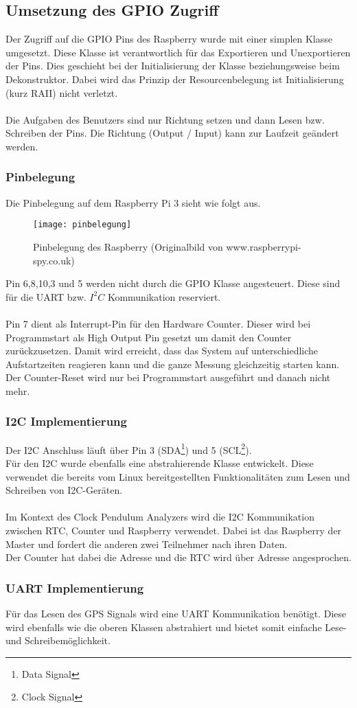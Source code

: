 \subsection{Umsetzung des GPIO Zugriff}
Der Zugriff auf die GPIO Pins des Raspberry wurde mit einer simplen Klasse umgesetzt. Diese Klasse ist verantwortlich für das Exportieren und Unexportieren der Pins. Dies geschieht bei der Initialisierung der Klasse beziehungsweise beim Dekonstruktor. Dabei wird das Prinzip der Resourcenbelegung ist Initialisierung (kurz RAII) nicht verletzt.\\
\\
Die Aufgaben des Benutzers sind nur Richtung setzen und dann Lesen bzw. Schreiben der Pins. Die Richtung (Output / Input) kann zur Laufzeit geändert werden.

\subsubsection{Pinbelegung}
Die Pinbelegung auf dem Raspberry Pi 3 sieht wie folgt aus.
\begin{figure}[H]
    \centering
    \texttt{[image: pinbelegung]}
    \caption{Pinbelegung des Raspberry (Originalbild von www.raspberrypi-spy.co.uk)}
\end{figure}

\noindent Pin 6,8,10,3 und 5 werden nicht durch die GPIO Klasse angesteuert. Diese sind für die UART bzw. $I^2C$ Kommunikation reserviert.\\\\
Pin 7 dient als Interrupt-Pin für den Hardware Counter. Dieser wird bei Programmstart als High Output Pin gesetzt um damit den Counter zurückzusetzen. Damit wird erreicht, dass das System auf unterschiedliche Aufstartzeiten reagieren kann und die ganze Messung gleichzeitig starten kann. Der Counter-Reset wird nur bei Programmstart ausgeführt und danach nicht mehr.

\subsubsection{I2C Implementierung}
Der I2C Anschluss läuft über Pin 3 (SDA\footnote{Data Signal}) und 5 (SCL\footnote{Clock Signal}).\\
Für den I2C wurde ebenfalls eine abstrahierende Klasse entwickelt. Diese verwendet die bereits vom Linux bereitgestellten Funktionalitäten zum Lesen und Schreiben von I2C-Geräten.\\
\\
Im Kontext des Clock Pendulum Analyzers wird die I2C Kommunikation zwischen RTC, Counter und Raspberry verwendet. Dabei ist das Raspberry der Master und fordert die anderen zwei Teilnehmer nach ihren Daten.\\
Der Counter hat dabei die Adresse %
und die RTC wird über Adresse %
angesprochen.

\subsubsection{UART Implementierung}%
Für das Lesen des GPS Signals wird eine UART Kommunikation benötigt. Diese wird ebenfalls wie die oberen Klassen abstrahiert und bietet somit einfache Lese- und Schreibemöglichkeit.\\
